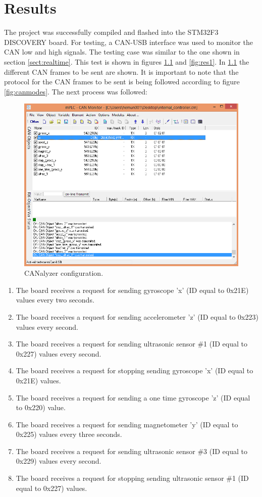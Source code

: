 \documentclass[12pt]{report}%
\begin{document}
\chapter{Results}
The project was successfully compiled and flashed into the STM32F3 DISCOVERY board. For testing, a CAN-USB interface was used to monitor the CAN low and high signals. The testing case was similar to the one shown in section \ref{sect:realtime}. This test is shown in figures \ref{fig:res2} and \ref{fig:res1}. In \ref{fig:res2} the different CAN frames to be sent are shown. It is important to note that the protocol for the CAN frames to be sent is being followed according to figure \ref{fig:canmodes}. The next process was followed:

\begin{figure}[ht]
	\centering
	\includegraphics[width=\textwidth]{results_2}
    \caption{CANalyzer configuration.}
    \label{fig:res2}
\end{figure}

\begin{enumerate}
\item The board receives a request for sending gyroscope 'x' (ID equal to 0x21E) values every two seconds.
\item The board receives a request for sending accelerometer 'z' (ID equal to 0x223) values every second.
\item The board receives a request for sending ultrasonic sensor \#1 (ID equal to 0x227) values every second.
\item The board receives a request for stopping sending gyroscope 'x' (ID equal to 0x21E) values.
\item The board receives a request for sending a one time gyroscope 'z' (ID equal to 0x220) value.
\item The board receives a request for sending magnetometer 'y' (ID equal to 0x225) values every three seconds.
\item The board receives a request for sending ultrasonic sensor \#3 (ID equal to 0x229) values every second.
\item The board receives a request for stopping sending ultrasonic sensor \#1 (ID equal to 0x227) values.
\end{enumerate}
\end{document}
